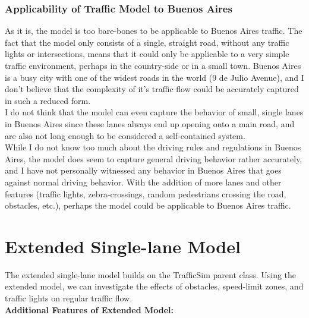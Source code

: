 \documentclass[11pt]{article}
\begin{document}
\subsubsection{Applicability of Traffic Model to Buenos Aires}

As it is, the model is too bare-bones to be applicable to Buenos Aires
traffic. The fact that the model only consists of a single, straight
road, without any traffic lights or intersections, means that it could
only be applicable to a very simple traffic environment, perhaps in the
country-side or in a small town. Buenos Aires is a busy city with one of
the widest roads in the world (9 de Julio Avenue), and I don't believe
that the complexity of it's traffic flow could be accurately captured in
such a reduced form.\\

I do not think that the model can even capture the behavior of small,
single lanes in Buenos Aires since these lanes always end up opening
onto a main road, and are also not long enough to be considered a
self-contained system.\\

While I do not know too much about the driving rules and regulations in
Buenos Aires, the model does seem to capture general driving behavior
rather accurately, and I have not personally witnessed any behavior in
Buenos Aires that goes against normal driving behavior. With the
addition of more lanes and other features (traffic lights,
zebra-crossings, random pedestrians crossing the road, obstacles, etc.),
perhaps the model could be applicable to Buenos Aires traffic.
\newpage
\section{Extended Single-lane Model}

The extended single-lane model builds on the TrafficSim parent class.
Using the extended model, we can investigate the effects of obstacles,
speed-limit zones, and traffic lights on regular traffic flow.\\

\textbf{Additional Features of Extended Model:}
\end{document}
